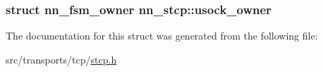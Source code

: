 \subsubsection[{usock\+\_\+owner}]{\setlength{\rightskip}{0pt plus 5cm}struct {\bf nn\+\_\+fsm\+\_\+owner} nn\+\_\+stcp\+::usock\+\_\+owner}\hypertarget{structnn__stcp_a973e075ff7bd5addceccbb5e4f44a149}{}\label{structnn__stcp_a973e075ff7bd5addceccbb5e4f44a149}


The documentation for this struct was generated from the following file\+:\begin{DoxyCompactItemize}
\item 
src/transports/tcp/\hyperlink{stcp_8h}{stcp.\+h}\end{DoxyCompactItemize}
